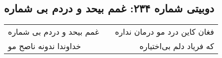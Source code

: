 \begin{center}
\section*{دوبیتی شماره ۲۳۴: غمم بیحد و دردم بی شماره}
\label{sec:234}
\begin{longtable}{l p{0.5cm} r}
غمم بیحد و دردم بی شماره
&&
فغان کاین درد مو درمان نداره
\\
خداوندا ندونه ناصح مو
&&
که فریاد دلم بی‌اختیاره
\\
\end{longtable}
\end{center}
